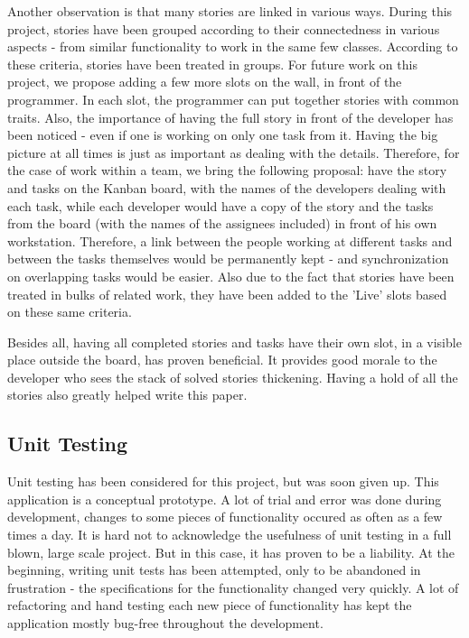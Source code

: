 Another observation is that many stories are linked in various ways.
During this project, stories have been grouped according to their connectedness
in various aspects - from similar functionality to work in the same few classes.
According to these criteria, stories have been treated in groups. For future
work on this project, we propose adding a few more slots on the wall, in front
of the programmer. In each slot, the programmer can put together stories with
common traits. Also, the importance of having the full story in front of the
developer has been noticed - even if one is working on only one task from it.
Having the big picture at all times is just as important as dealing with the
details. Therefore, for the case of work within a team, we bring the following
proposal: have the story and tasks on the Kanban board, with the names of the
developers dealing with each task, while each developer would have a copy of the
story and the tasks from the board (with the names of the assignees included) in
front of his own workstation. Therefore, a link between the people working at
different tasks and between the tasks themselves would be permanently kept - and
synchronization on overlapping tasks would be easier. Also due to the fact that
stories have been treated in bulks of related work, they have been added to the
'Live' slots based on these same criteria. \newline

Besides all, having all completed stories and tasks have their own slot, in
a visible place outside the board, has proven beneficial. It provides good
morale to the developer who sees the stack of solved stories thickening.
Having a hold of all the stories also greatly helped write this paper. \newline

\subsection{Unit Testing}

Unit testing has been considered for this project, but was soon given up. This
application is a conceptual prototype. A lot of trial and error was done during
development, changes to some pieces of functionality occured as often as a few
times a day. It is hard not to acknowledge the usefulness of unit testing in a
full blown, large scale project. But in this case, it has proven to be a
liability. At the beginning, writing unit tests has been attempted, only to be
abandoned in frustration -  the specifications for the functionality changed
very quickly. A lot of refactoring and hand testing each new piece of
functionality has kept the application mostly bug-free throughout the
development.

